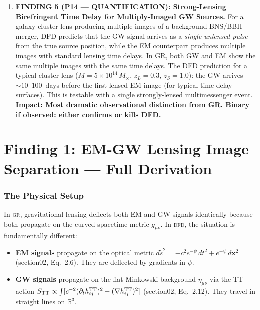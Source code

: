 \documentclass[11pt]{article}
\newcommand{\ee}[1]{\times 10^{#1}}
\newcommand{\DFD}{\textsc{dfd}}
\newcommand{\GR}{\textsc{gr}}
\begin{document}
\begin{tcolorbox}[colback=blue!5!white, colframe=blue!60!black,
  title=\textbf{W4i15 TOP 5 FINDINGS --- Ranked by Programme Impact}]
\begin{enumerate}
\item \textbf{FINDING 5 (P14 --- QUANTIFICATION): Strong-Lensing
  Birefringent Time Delay for Multiply-Imaged GW Sources.}
  For a galaxy-cluster lens producing multiple images of a background
  BNS/BBH merger, DFD predicts that the GW signal arrives as a
  \emph{single unlensed pulse} from the true source position, while
  the EM counterpart produces multiple images with standard lensing
  time delays. In GR, both GW and EM show the same multiple images
  with the same time delays. The DFD prediction for a typical
  cluster lens ($M = 5\ee{14}\,M_\odot$, $z_L = 0.3$, $z_S = 1.0$):
  the GW arrives $\sim 10$--$100$~days before the first lensed EM
  image (for typical time delay surfaces). This is testable with a
  single strongly-lensed multimessenger event.
  \textbf{Impact: Most dramatic observational distinction from GR.
  Binary if observed: either confirms or kills DFD.}

\end{enumerate}
\end{tcolorbox}


\part{Finding 1: EM-GW Lensing Image Separation --- Full Derivation}
\label{part:lensing-separation}

\section{The Physical Setup}

In \GR, gravitational lensing deflects both EM and GW signals identically
because both propagate on the curved spacetime metric $g_{\mu\nu}$. In
\DFD, the situation is fundamentally different:

\begin{itemize}[nosep]
\item \textbf{EM signals} propagate on the optical metric
  $d\tilde{s}^2 = -c^2 e^{-\psi}\,dt^2 + e^{+\psi}\,d\mathbf{x}^2$
  (section02, Eq.~2.6). They are deflected by gradients in $\psi$.
\item \textbf{GW signals} propagate on the flat Minkowski background
  $\eta_{\mu\nu}$ via the TT action $S_{\rm TT} \propto \int
  [c^{-2}(\partial_t h_{ij}^{\rm TT})^2 - (\nabla h_{ij}^{\rm TT})^2]$
  (section02, Eq.~2.12). They travel in straight lines on $\mathbb{R}^3$.
\end{itemize}
\end{document}
